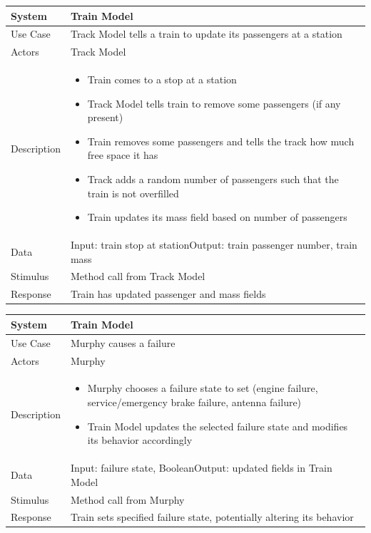 \documentclass{article}
\begin{document}
    \begin{longtable}{
    || >{\raggedright\arraybackslash}m{}
    | >{\raggedright\arraybackslash}m{}||}
    \hline
    \textbf{System} &  \textbf{Train Model} \\
    \hline
    Use Case & Track Model tells a train to update its passengers at a station\\
    \hline
    Actors & Track Model\\
    \hline
    Description & \begin{itemize}
        \item Train comes to a stop at a station
        \item Track Model tells train to remove some passengers (if any present)
        \item Train removes some passengers and tells the track how much free space it has
        \item Track adds a random number of passengers such that the train is not overfilled
        \item Train updates its mass field based on number of passengers
    \end{itemize}\\
    \hline
    Data & Input: train stop at station\newline Output: train passenger number, train mass\\
    \hline
    Stimulus & Method call from Track Model\\
    \hline
    Response & Train has updated passenger and mass fields\\
    \hline
    \end{longtable}
    
    \begin{longtable}{
    || >{\raggedright\arraybackslash}m{}
    | >{\raggedright\arraybackslash}m{}||}
    \hline
    \textbf{System} &  \textbf{Train Model} \\
    \hline
    Use Case & Murphy causes a failure\\
    \hline
    Actors & Murphy\\
    \hline
    Description & \begin{itemize}
        \item Murphy chooses a failure state to set (engine failure, service/emergency brake failure, antenna failure)
        \item Train Model updates the selected failure state and modifies its behavior accordingly
    \end{itemize}\\
    \hline
    Data & Input: failure state, Boolean\newline Output: updated fields in Train Model\\
    \hline
    Stimulus & Method call from Murphy\\
    \hline
    Response & Train sets specified failure state, potentially altering its behavior\\
    \hline
    \end{longtable}
    
\end{document}
